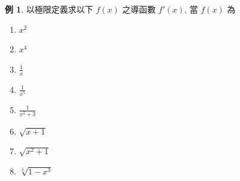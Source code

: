 \documentclass[12pt]{extarticle}
\theoremstyle{definition}
\newtheorem*{ex}{例}
\begin{document}
\begin{ex}
  以極限定義求以下 $f(x)$ 之導函數 $f'(x)$, 當 $f(x)$ 為 
  \setlength{\columnsep}{-3mm}
  \begin{multicols}{8}
    \begin{enumerate}\setlength\itemsep{0em}
      \item $x^2$
      \item $x^4$
      \item $\frac{1}{x}$ 
      \item $\frac{1}{x^5}$
      \item $\frac{1}{x^2 + 3}$
      \item $\sqrt{x + 1}$
      \item $\sqrt{x^2 + 1}$
      \item $\sqrt[3]{1 - x^3}$
    \end{enumerate}
  \end{multicols}
\end{ex}
\end{document}

